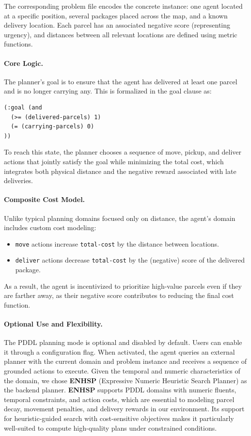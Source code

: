 The corresponding problem file encodes the concrete instance: one agent located at a specific position, several packages placed across the map, and a known delivery location. Each parcel has an associated negative score (representing urgency), and distances between all relevant locations are defined using metric functions.

\paragraph{Core Logic.}
The planner's goal is to ensure that the agent has delivered at least one parcel and is no longer carrying any. This is formalized in the goal clause as:
\begin{verbatim}
(:goal (and
  (>= (delivered-parcels) 1)
  (= (carrying-parcels) 0)
))
\end{verbatim}

To reach this state, the planner chooses a sequence of move, pickup, and deliver actions that jointly satisfy the goal while minimizing the total cost, which integrates both physical distance and the negative reward associated with late deliveries.

\paragraph{Composite Cost Model.}
Unlike typical planning domains focused only on distance, the agent's domain includes custom cost modeling:
\begin{itemize}
    \item \texttt{move} actions increase \texttt{total-cost} by the distance between locations.
    \item \texttt{deliver} actions decrease \texttt{total-cost} by the (negative) score of the delivered package.
\end{itemize}

As a result, the agent is incentivized to prioritize high-value parcels even if they are farther away, as their negative score contributes to reducing the final cost function.

\paragraph{Optional Use and Flexibility.}
The PDDL planning mode is optional and disabled by default. Users can enable it through a configuration flag. When activated, the agent queries an external planner with the current domain and problem instance and receives a sequence of grounded actions to execute. Given the temporal and numeric characteristics of the domain, we chose \textbf{ENHSP} (Expressive Numeric Heuristic Search Planner) as the backend planner. \textbf{ENHSP} supports PDDL domains with numeric fluents, temporal constraints, and action costs, which are essential to modeling parcel decay, movement penalties, and delivery rewards in our environment. Its support for heuristic-guided search with cost-sensitive objectives makes it particularly well-suited to compute high-quality plans under constrained conditions.



